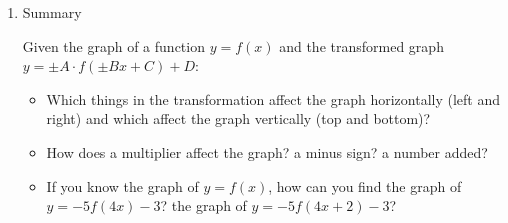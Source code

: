 \documentclass[number]{ximera}
\begin{document}
\begin{enumerate}
\begin{itemize}
\end{itemize}

\item Summary

Given the graph of a function $y = f(x)$ and the transformed graph $y = \pm A \cdot f(\pm Bx + C) +D$:

\begin{itemize}

\item Which things in the transformation affect the graph horizontally (left and right) and which affect the graph vertically (top and bottom)?

\item How does a multiplier affect the graph? a minus sign? a number added? 

\item If you know the graph of $y = f(x)$, how can you find the graph of $y = -5 f(4x) - 3$? the graph of $y = -5 f(4x + 2) - 3$? 

\end{itemize}

\end{enumerate}
\end{document}
